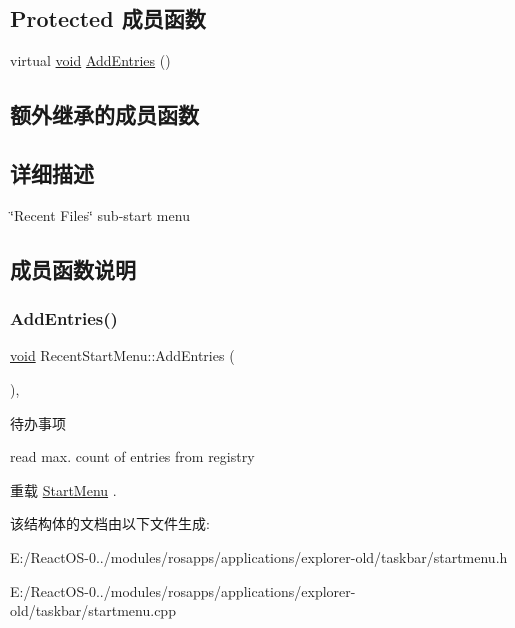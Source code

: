 \subsection*{Protected 成员函数}
\begin{DoxyCompactItemize}
\item 
virtual \hyperlink{interfacevoid}{void} \hyperlink{struct_recent_start_menu_a18e48b314b1c1f302f917b9e5e9801f4}{Add\+Entries} ()
\end{DoxyCompactItemize}
\subsection*{额外继承的成员函数}


\subsection{详细描述}
\char`\"{}\+Recent Files\char`\"{} sub-\/start menu 

\subsection{成员函数说明}
\mbox{\label{struct_recent_start_menu_a18e48b314b1c1f302f917b9e5e9801f4}} 
\subsubsection{\texorpdfstring{Add\+Entries()}{AddEntries()}}
{\footnotesize\ttfamily \hyperlink{interfacevoid}{void} Recent\+Start\+Menu\+::\+Add\+Entries (\begin{DoxyParamCaption}{ }\end{DoxyParamCaption})\hspace{0.3cm}{\ttfamily [protected]}, {\ttfamily [virtual]}}

\begin{DoxyRefDesc}{待办事项}
\item[\hyperlink{todo__todo000071}{待办事项}]read max. count of entries from registry \end{DoxyRefDesc}


重载 \hyperlink{struct_start_menu}{Start\+Menu} .



该结构体的文档由以下文件生成\+:\begin{DoxyCompactItemize}
\item 
E\+:/\+React\+O\+S-\/0../modules/rosapps/applications/explorer-\/old/taskbar/startmenu.\+h\item 
E\+:/\+React\+O\+S-\/0../modules/rosapps/applications/explorer-\/old/taskbar/startmenu.\+cpp\end{DoxyCompactItemize}
